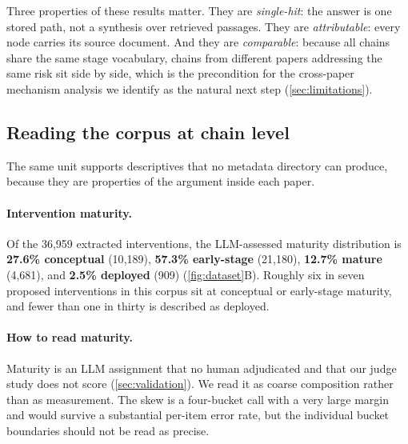 \documentclass[10pt,twocolumn,letterpaper]{article}
\begin{document}
Three properties of these results matter. They are \emph{single-hit}: the answer
is one stored path, not a synthesis over retrieved passages. They are
\emph{attributable}: every node carries its source document. And they are
\emph{comparable}: because all chains share the same stage vocabulary, chains
from different papers addressing the same risk sit side by side, which is the
precondition for the cross-paper mechanism analysis we identify as the natural
next step (\cref{sec:limitations}).

\subsection{Reading the corpus at chain level}

The same unit supports descriptives that no metadata directory can produce,
because they are properties of the argument inside each paper.

\paragraph{Intervention maturity.} Of the 36{,}959 extracted interventions, the
LLM-assessed maturity distribution is \textbf{27.6\% conceptual} (10{,}189),
\textbf{57.3\% early-stage} (21{,}180), \textbf{12.7\% mature} (4{,}681), and
\textbf{2.5\% deployed} (909) (\cref{fig:dataset}B). Roughly six in seven proposed
interventions in this corpus sit at conceptual or early-stage maturity, and fewer
than one in thirty is described as deployed.

\paragraph{How to read maturity.} Maturity is an LLM assignment that no human
adjudicated and that our judge study does not score (\cref{sec:validation}). We
read it as coarse composition rather than as measurement. The skew is a
four-bucket call with a very large margin and would survive a substantial
per-item error rate, but the individual bucket boundaries should not be read as
precise.
\end{document}
